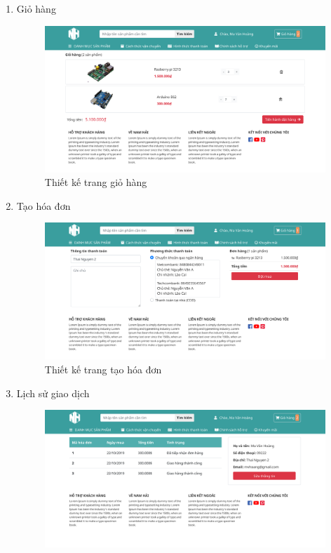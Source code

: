 \begin{enumerate}[label=\textbf{\alph*)}]
\begin{figure}[h!]
	      \end{figure}
	      \newpage
	\item Giỏ hàng
	      \begin{figure}[h!]
		      \includegraphics[width=\linewidth]{fig/r_cart.png}
		      \caption{Thiết kế trang giỏ hàng}
	      \end{figure}
	\item Tạo hóa đơn
	      \begin{figure}[h!]
		      \includegraphics[width=\linewidth]{fig/r_make_order.png}
		      \caption{Thiết kế trang tạo hóa đơn}
	      \end{figure}
	      \newpage
	\item Lịch sử giao dịch
	      \begin{figure}[h!]
		      \includegraphics[width=\linewidth]{fig/r_user1.png}

\end{figure}
\end{enumerate}
